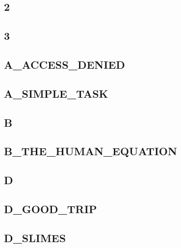 \subsection{2}
\raggedbottom
\hrulefill

\subsection{3}
\raggedbottom
\hrulefill

\subsection{A_ACCESS_DENIED}
\raggedbottom
\hrulefill

\subsection{A_SIMPLE_TASK}
\raggedbottom
\hrulefill

\subsection{B}
\raggedbottom
\hrulefill

\subsection{B_THE_HUMAN_EQUATION}
\raggedbottom
\hrulefill

\subsection{D}
\raggedbottom
\hrulefill

\subsection{D_GOOD_TRIP}
\raggedbottom
\hrulefill

\subsection{D_SLIMES}
\raggedbottom
\hrulefill

